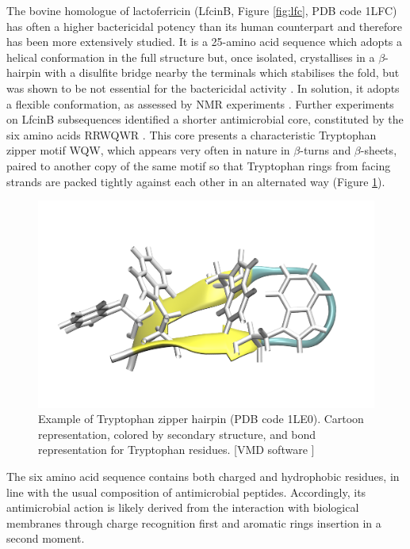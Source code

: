 The bovine homologue of lactoferricin (LfcinB, Figure \ref{fig:lfc}, PDB code 1LFC) has often a higher bactericidal potency than its human counterpart \citep{Cochran2001} and therefore has been more extensively studied. It is a 25-amino acid sequence which adopts a helical conformation in the full structure but, once isolated, crystallises in a $\beta$-hairpin with a disulfite bridge nearby the terminals which stabilises the fold, but was shown to be not essential for the bactericidal activity \citep{Cochran2001}.
%
In solution, it adopts a flexible conformation, as assessed by NMR experiments \citep{Hwang1998}. 
%
Further experiments on LfcinB subsequences identified a shorter antimicrobial core, constituted by the six amino acids RRWQWR \citep{Schibli1999}. This core presents a characteristic Tryptophan zipper motif WQW, which appears very often in nature in $\beta$-turns and $\beta$-sheets, paired to another copy of the same motif \citep{Cochran2001} so that Tryptophan rings from facing strands are packed tightly against each other in an alternated way (Figure \ref{fig:trp_zip}).

\begin{figure}
\begin{center}
\includegraphics[width=0.5\linewidth]{1introduction/pics/trp_zip}
\caption[Tryptophan zipper 1LE0]{Example of Tryptophan zipper hairpin (PDB code 1LE0). Cartoon representation, colored by secondary structure, and bond representation for Tryptophan residues. [VMD software \citet{HUMP96}]} \label{fig:trp_zip}
\end{center}
\end{figure}

The six amino acid sequence contains both charged and hydrophobic residues, in line with the usual composition of antimicrobial peptides. Accordingly, its antimicrobial action is likely derived from the interaction with biological membranes through charge recognition first and aromatic rings insertion in a second moment.

